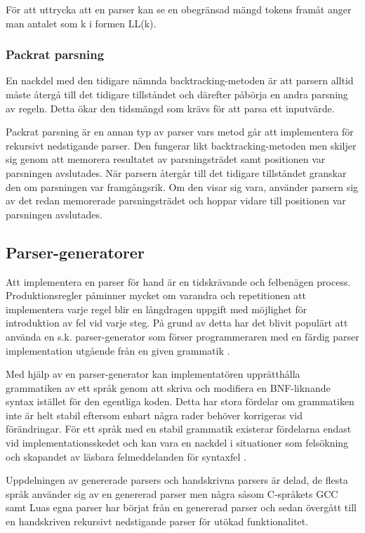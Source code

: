 För att uttrycka att en parser kan se en obegränsad mängd tokens framåt anger
man antalet som k i formen LL(k).

\subsubsection{Packrat parsning}

En nackdel med den tidigare nämnda backtracking-metoden är att parsern alltid
måste återgå till det tidigare tillståndet och därefter påbörja en andra
parsning av regeln. Detta ökar den tidsmängd som krävs för att parsa ett
inputvärde.

Packrat parsning är en annan typ av parser vars metod går att implementera för
rekursivt nedstigande parser. Den fungerar likt backtracking-metoden men
skiljer sig genom att memorera resultatet av parsningsträdet samt positionen
var parsningen avslutades. När parsern återgår till det tidigare tillståndet
granskar den om parsningen var framgångsrik. Om den visar sig vara, använder
parsern sig av det redan memorerade parsningsträdet och hoppar vidare till
positionen var parsningen avslutades.

\subsection{Parser-generatorer}

Att implementera en parser för hand är en tidskrävande och felbenägen process.
Produktionsregler påminner mycket om varandra och repetitionen att
implementera varje regel blir en långdragen uppgift med möjlighet för
introduktion av fel vid varje steg. På grund av detta har det blivit populärt
att använda en s.k. parser-generator som förser programmeraren med en färdig
parser implementation utgående från en given grammatik \citep[s. 26]{pt10}.

Med hjälp av en parser-generator kan implementatören upprätthålla grammatiken
av ett språk genom att skriva och modifiera en BNF-liknande syntax istället
för den egentliga koden. Detta har stora fördelar om grammatiken inte är helt
stabil eftersom enbart några rader behöver korrigeras vid förändringar. För
ett språk med en stabil grammatik existerar fördelarna endast vid
implementationsskedet och kan vara en nackdel i situationer som felsökning och
skapandet av läsbara felmeddelanden för syntaxfel \citep[s. 175]{bf09}.

Uppdelningen av genererade parsers och handskrivna parsers är delad, de flesta
språk använder sig av en genererad parser men några såsom C-språkets GCC \citep{gcc}
samt Luas egna parser \citep{luaimp} har börjat från en genererad parser och
sedan övergått till en handskriven rekursivt nedstigande parser för utökad
funktionalitet.

